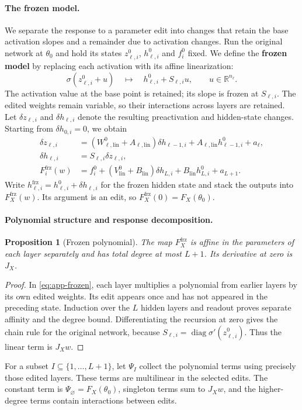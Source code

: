 \documentclass[twoside]{article}
\newtheorem{proposition}[theorem]{Proposition}
\theoremstyle{remark}
\DeclareMathOperator{\diag}{diag}
\newcommand{\R}{\mathbb R}
\newcommand{\frz}{\mathrm{frz}}
\theoremstyle{highlightdefinition}
\theoremstyle{remark}
\begin{document}
\paragraph{The frozen model.}
We separate the response to a parameter edit into changes that retain the base activation slopes and a remainder due to activation changes. Run the original network at $\theta_0$ and hold its states $z_{\ell,i}^0$, $h_{\ell,i}^0$ and $f_i^0$ fixed. We define the \textbf{frozen model} by replacing each activation with its affine linearization:
\[
 \sigma(z_{\ell,i}^0+u)\quad\longmapsto\quad h_{\ell,i}^0+S_{\ell,i}u,
 \qquad u\in\R^{n_\ell}.
\]
The activation value at the base point is retained; its slope is frozen at $S_{\ell,i}$. The edited weights remain variable, so their interactions across layers are retained. Let $\delta z_{\ell,i}$ and $\delta h_{\ell,i}$ denote the resulting preactivation and hidden-state changes. Starting from $\delta h_{0,i}=0$, we obtain
\begin{align}
 \delta z_{\ell,i}&=(W_{\ell,\mathrm{lin}}^0+A_{\ell,\mathrm{lin}})\delta h_{\ell-1,i}+A_{\ell,\mathrm{lin}}h_{\ell-1,i}^0+a_\ell,\nonumber\\
 \delta h_{\ell,i}&=S_{\ell,i}\delta z_{\ell,i},\label{eq:app-frozen}\\
 F_i^{\frz}(w)&=f_i^0+(V_{\mathrm{lin}}^0+B_{\mathrm{lin}})\delta h_{L,i}+B_{\mathrm{lin}}h_{L,i}^0+a_{L+1}.\nonumber
\end{align}
Write $h_{\ell,i}^{\frz}=h_{\ell,i}^0+\delta h_{\ell,i}$ for the frozen hidden state and stack the outputs into $F_X^{\frz}(w)$. Its argument is an edit, so $F_X^{\frz}(0)=F_X(\theta_0)$.

\paragraph{Polynomial structure and response decomposition.}
\begin{proposition}[Frozen polynomial]
The map $F_X^{\frz}$ is affine in the parameters of each layer separately and has total degree at most $L+1$. Its derivative at zero is $J_X$.
\end{proposition}
\begin{proof}
In \eqref{eq:app-frozen}, each layer multiplies a polynomial from earlier layers by its own edited weights. Its edit appears once and has not appeared in the preceding state. Induction over the $L$ hidden layers and readout proves separate affinity and the degree bound. Differentiating the recursion at zero gives the chain rule for the original network, because $S_{\ell,i}=\diag\sigma'(z_{\ell,i}^0)$. Thus the linear term is $J_Xw$.
\end{proof}
For a subset $I\subseteq\{1,\ldots,L+1\}$, let $\Psi_I$ collect the polynomial terms using precisely those edited layers. These terms are multilinear in the selected edits. The constant term is $\Psi_\varnothing=F_X(\theta_0)$, singleton terms sum to $J_Xw$, and the higher-degree terms contain interactions between edits.
\end{document}
